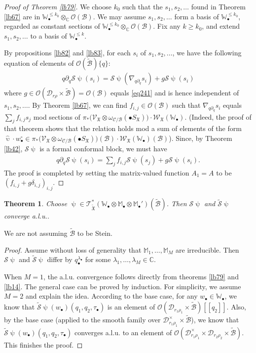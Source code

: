 \documentclass[12pt,a4paper,notitlepage]{report}
\theoremstyle{definition}
\theoremstyle{plain}
\newtheorem{thm}[df]{Theorem}
\newcommand{\fk}{\mathfrak}
\newcommand{\mc}{\mathcal}
\newcommand{\wtd}{\widetilde}
\newcommand{\wht}{\widehat}
\newcommand{\scr}{\mathscr}
\newcommand{\blt}{\bullet}
\newcommand{\Wbb}{\mathbb W}
\newcommand{\Mbb}{\mathbb M}
\newcommand{\Cbb}{\mathbb C}
\numberwithin{equation}{section}
\begin{document}
\begin{proof}[Proof of Theorem \ref{lb79}]
We choose $k_0$ such that the $s_1,s_2,\dots$ found in Theorem \ref{lb67} are in $\Wbb_\blt^{\leq k_0}\otimes_\Cbb\scr O(\mc B)$. We may assume $s_1,s_2,\dots$ form a basis of $\Wbb_\blt^{\leq k_0}$, regarded as constant sections of $\Wbb_\blt^{\leq k_0}\otimes_\Cbb\scr O(\mc B)$. Fix any $k\geq k_0$, and extend $s_1,s_2,\dots$ to a basis of $\Wbb_\blt^{\leq k}$.

By propositions \ref{lb82} and \ref{lb83},  for each $s_i$ of $s_1,s_2,\dots$,  we have the following equation of elements of $\scr O(\wtd{\mc B})\{q\}$:
\begin{align*}
q\partial_q\mc S\uppsi(s_i)=\mc S\uppsi(\nabla_{q\partial_q}s_i)+g\mc S\uppsi(s_i)
\end{align*}
where $g\in\scr O(\mc D_{r\rho}\times\wtd{\mc B})=\scr O(\mc B)$ equals \eqref{eq241} and is hence independent of $s_1,s_2,\dots$. By Theorem \ref{lb67}, we can find $f_{i,j}\in\scr O(\mc B)$ such that $\nabla_{q\partial_q}s_i$ equals $\sum_j f_{i,j}s_j$ mod  sections of $\pi_*\big(\scr V_{\fk X}\otimes\omega_{\mc C/\mc B}(\blt S_{\fk X})\big)\cdot \scr W_{\fk X}(\Wbb_\blt)$. (Indeed, the proof of that theorem shows that the relation holds mod a sum of elements of the form $\wht\upupsilon\cdot w_\blt^\circ\in\pi_*\big(\scr V_{\fk X}\otimes\omega_{\mc C/\mc B}(\blt S_{\fk X})\big)(\mc B)\cdot \scr W_{\fk X}(\Wbb_\blt)(\mc B)$). Since, by Theorem \ref{lb42}, $\mc S\uppsi$ is a formal conformal block, we must have
\begin{align*}
q\partial_q\mc S\uppsi(s_i)=\sum_j f_{i,j}\mc S\uppsi(s_j)+g\mc S\uppsi(s_i).
\end{align*}
The proof is  completed by setting the matrix-valued function $A_1=A$ to be $(f_{i,j}+g\delta_{i,j})_{i,j}$.
\end{proof}


\begin{thm}
Choose $\uppsi\in\scr T_{\wtd{\fk X}}^*(\Wbb_\blt\otimes\Mbb_\blt\otimes\Mbb_\blt')(\wtd{\mc B})$. Then $\mc S\uppsi$ and $\wtd{\mc S}\uppsi$ converge a.l.u..
\end{thm}

We are not assuming $\wtd{\mc B}$ to be Stein.
\begin{proof}
Assume without loss of generality that $\Mbb_1,\dots,\Mbb_M$ are irreducible. Then $\mc S\uppsi$ and $\wtd{\mc S}\uppsi$ differ by $q_\blt^{\lambda_\blt}$ for some $\lambda_1,\dots,\lambda_M\in\Cbb$.

When $M=1$, the a.l.u. convergence follows directly from theorems \ref{lb79} and \ref{lb14}. The general case can be proved by induction. For simplicity, we assume $M=2$ and explain the idea. According to the base case, for any $w_\blt\in\Wbb_\blt$, we know that $\wtd{\mc S}\uppsi(w_\blt)(q_1,q_2,\tau_\blt)$ is an element of $\scr O(\mc D_{r_1\rho_1}\times\wtd{\mc B})[[q_2]]$. Also, by the base case (applied to the smooth family over $\mc D_{r_1\rho_1}^\times\times\wtd{\mc B}$), we know that $\wtd{\mc S}\uppsi(w_\blt)(q_1,q_2,\tau_\blt)$ converges a.l.u. to an element of $\scr O(\mc D_{r_1\rho_1}^\times\times\mc D_{r_2\rho_2}\times\wtd{\mc B})$. This finishes the proof.
\end{proof}
\end{document}
